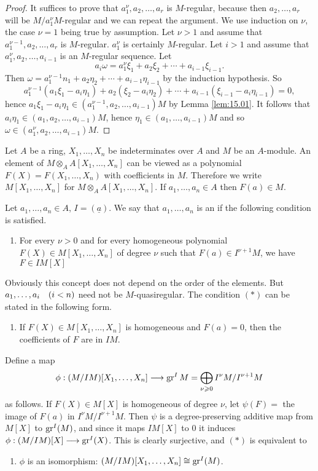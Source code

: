 \documentclass[../main]{subfiles}
\begin{document}
\begin{proof}
It suffices to prove that $a_1^\nu, a_2, \ldots, a_r$ is $M$-regular, because then $a_2, \ldots, a_r$ will be $M/a_1^{\nu}M$-regular and we can repeat the argument. We use induction on $\nu$, the case $\nu=1$ being true by assumption. Let $\nu>1$ and assume that $a_1^{\nu-1}, a_2, \ldots, a_r$ is $M$-regular. $a_1^\nu$ is certainly $M$-regular. Let $i>1$ and assume that $a_1^\nu, a_2, \ldots, a_{i-1}$ is an $M$-regular sequence. Let \[a_i\omega=a_1^\nu\xi_1+a_2\xi_2+\cdots+a_{i-1}\xi_{i-1}.\] Then $\omega=a_1^{\nu-1} n_1+a_2\eta_2+\cdots+a_{i-1}\eta_{i-1}$ by the induction hypothesis. So \[a_1^{\nu-1}(a_1 \xi_1-a_i \eta_1)+a_2(\xi_2-a_i \eta_2)+\cdots+a_{i-1}(\xi_{i-1}-a_i \eta_{i-1})=0,\] hence $a_1 \xi_1-a_i \eta_1 \in(a_1^{\nu-1}, a_2, \ldots, a_{i-1})M$ by Lemma \ref{lem:15.01}. It follows that \newline $a_i \eta_1 \in(a_1, a_2, \ldots, a_{i-1})M$, hence $\eta_1 \in(a_1, \ldots, a_{i-1}) M$ and so $\omega \in(a_1^\nu, a_2, \ldots, a_{i-1})M$.
\end{proof} 

\newparagraph Let $A$ be a ring, $X_1, \ldots, X_n$ be indeterminates over $A$ and $M$ be an $A$-module. An element of $M \otimes_A A[X_1, \ldots, X_n]$ can be viewed as a polynomial $F(X)=F(X_1, \ldots, X_n)$ with coefficients in $M$. Therefore we write $M[X_1, \ldots, X_n]$ for $M \otimes_A A[X_1, \ldots, X_n]$. If $a_1, \ldots, a_n \in A$ then $F(a) \in M$.

Let $a_1, \ldots, a_n \in A$, $I=(\underline{a})$. We say that $a_1, \ldots, a_n$ is an  if the following condition is satisfied.
\begin{enumerate}[label = (15.$\ast$), ref= cond:15.*]
    \item For every $\nu>0$ and for every homogeneous polynomial $F(X) \in M[X_1, \ldots, X_n]$ of degree $\nu$ such that $F(a) \in I^{\nu+1} M$, we have $F \in IM[X]$
\end{enumerate}
Obviously this concept does not depend on the order of the elements. But $a_1, \ldots, a_i\for{i<n}$ need not be $M$-quasiregular. The condition $(*)$ can be stated in the following form.
\begin{enumerate}[label = (15.$\ast\ast$), ref= cond:15.**]
    \item If $F(X) \in M[X_1, \ldots, X_n]$ is homogeneous and $F(a)=0$, then the coefficients of $F$ are in $IM$.
\end{enumerate}
Define a map \[\phi:(M / I M)[X_1, \dots, X_n] \longrightarrow \operatorname{gr}^IM=\bigoplus_{\nu \geqslant 0} I^\nu M/I^{\nu+1} M\] as follows. If $F(X) \in M[X]$ is homogeneous of degree $\nu$, let $\psi(F)=$ the image of $F(a)$ in $I^\nu M / I^{\nu+1} M$. Then $\psi$ is a degree-preserving additive map from $M[X]$ to $\operatorname{gr}^I(M)$, and since it maps $IM[X]$ to $0$ it induces $\phi:(M/IM)[X]\longrightarrow\operatorname{gr}^I(X)$. This is clearly surjective, and $(*)$ is equivalent to
\begin{enumerate}[label = (15.$\ast\ast\ast$), ref= cond:15.***]
    \item $\phi$ is an isomorphism: $(M/IM)[X_1,\dots,X_n]\cong\operatorname{gr}^I(M)$.
\end{enumerate}
\end{document}
